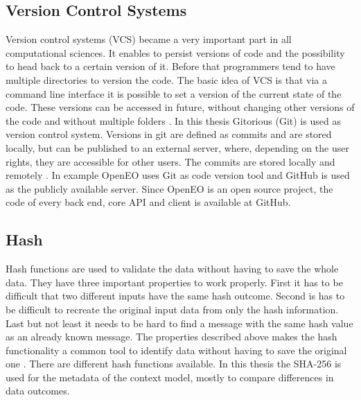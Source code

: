 \documentclass[draft,final]{vutinfth} %
\begin{document}
\subsection{Version Control Systems}\label{Version Control Systems}
Version control systems (VCS) became a very important part in all computational sciences. It enables to persist versions of code and the possibility to head back to a certain version of it. Before that programmers tend to have multiple directories to version the code. The basic idea of VCS is that via a command line interface it is possible to set a version of the current state of the code. These versions can be accessed in future, without changing other versions of the code and without multiple folders \cite{10.1109/MCSE.2009.194}. 
In this thesis Gitorious (Git) is used as version control system. Versions in git are defined as commits and are stored locally, but can be published to an external server, where, depending on the user rights, they are accessible for other users. The commits are stored locally and remotely \cite{QuickGit}. In example OpenEO uses Git as code version tool and GitHub is used as the publicly available server. Since OpenEO is an open source project, the code of every back end, core API and client is available at GitHub.  

\subsection{Hash}\label{Hash}
Hash functions are used to validate the data without having to save the whole data. They have three important properties to work properly. First it has to be difficult that two different inputs have the same hash outcome. Second is has to be difficult to recreate the original input data from only the hash information. Last but not least it needs to be hard to find a message with the same hash value as an already known message. The properties described above makes the hash functionality a common tool to identify data without having to save the original one \cite{3b412889270f46f59740fbf1ca8cd7e0}.  
There are different hash functions available. In this thesis the SHA-256 is used for the metadata of the context model, mostly to compare differences in data outcomes.

\end{document}
